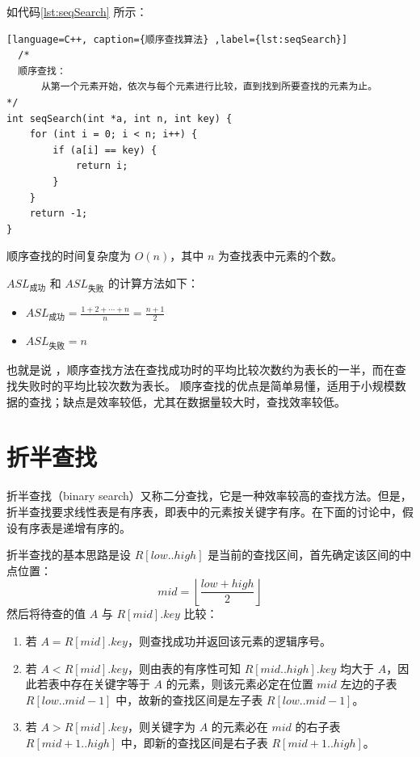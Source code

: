 \documentclass[lang=cn,newtx,10pt,scheme=chinese]{../elegantbook}
\begin{document}
如代码\ref{lst:seqSearch} 所示：

\begin{lstlisting}[language=C++, caption={顺序查找算法} ,label={lst:seqSearch}]
  /*
  顺序查找：
      从第一个元素开始，依次与每个元素进行比较，直到找到所要查找的元素为止。
*/
int seqSearch(int *a, int n, int key) {
    for (int i = 0; i < n; i++) {
        if (a[i] == key) {
            return i;
        }
    }
    return -1;
}

\end{lstlisting}

顺序查找的时间复杂度为 $O(n)$，其中 $n$ 为查找表中元素的个数。

$ASL_{\text{成功}}$ 和 $ASL_{\text{失败}}$ 的计算方法如下：

\begin{itemize}
  \item $ASL_{\text{成功}} = \frac{1 + 2 + \cdots + n}{n} = \frac{n + 1}{2}$
  \item $ASL_{\text{失败}} = n$
  \end{itemize}

也就是说 ，顺序查找方法在查找成功时的平均比较次数约为表长的一半，而在查找失败时的平均比较次数为表长。
顺序查找的优点是简单易懂，适用于小规模数据的查找；缺点是效率较低，尤其在数据量较大时，查找效率较低。

\section{折半查找}
折半查找（binary search）又称二分查找，它是一种效率较高的查找方法。但是，折半查找要求线性表是有序表，即表中的元素按关键字有序。在下面的讨论中，假设有序表是递增有序的。

折半查找的基本思路是设 $R[low..high]$ 是当前的查找区间，首先确定该区间的中点位置：
\[
mid = \left\lfloor \frac{low + high}{2} \right\rfloor
\]
然后将待查的值 $A$ 与 $R[mid].key$ 比较：

\begin{enumerate}
  \item 若 $A = R[mid].key$，则查找成功并返回该元素的逻辑序号。
  \item 若 $A < R[mid].key$，则由表的有序性可知 $R[mid..high].key$ 均大于 $A$，因此若表中存在关键字等于 $A$ 的元素，则该元素必定在位置 $mid$ 左边的子表 $R[low..mid-1]$ 中，故新的查找区间是左子表 $R[low..mid-1]$。
  \item 若 $A > R[mid].key$，则关键字为 $A$ 的元素必在 $mid$ 的右子表 $R[mid+1..high]$ 中，即新的查找区间是右子表 $R[mid+1..high]$。
\end{enumerate}
\end{document}
